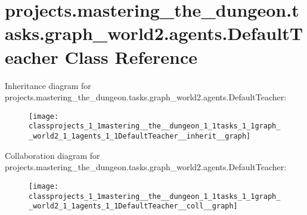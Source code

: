 \hypertarget{classprojects_1_1mastering__the__dungeon_1_1tasks_1_1graph__world2_1_1agents_1_1DefaultTeacher}{}\section{projects.\+mastering\+\_\+the\+\_\+dungeon.\+tasks.\+graph\+\_\+world2.\+agents.\+Default\+Teacher Class Reference}
\label{classprojects_1_1mastering__the__dungeon_1_1tasks_1_1graph__world2_1_1agents_1_1DefaultTeacher}


Inheritance diagram for projects.\+mastering\+\_\+the\+\_\+dungeon.\+tasks.\+graph\+\_\+world2.\+agents.\+Default\+Teacher\+:
\nopagebreak
\begin{figure}[H]
\begin{center}
\leavevmode
\texttt{[image: classprojects\_1\_1mastering\_\_the\_\_dungeon\_1\_1tasks\_1\_1graph\_\_world2\_1\_1agents\_1\_1DefaultTeacher\_\_inherit\_\_graph]}
\end{center}
\end{figure}


Collaboration diagram for projects.\+mastering\+\_\+the\+\_\+dungeon.\+tasks.\+graph\+\_\+world2.\+agents.\+Default\+Teacher\+:
\nopagebreak
\begin{figure}[H]
\begin{center}
\leavevmode
\texttt{[image: classprojects\_1\_1mastering\_\_the\_\_dungeon\_1\_1tasks\_1\_1graph\_\_world2\_1\_1agents\_1\_1DefaultTeacher\_\_coll\_\_graph]}
\end{center}
\end{figure}
